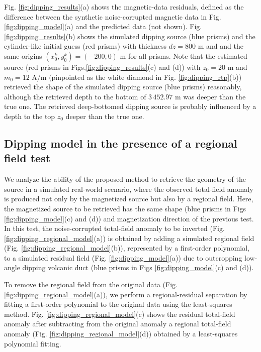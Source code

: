 Fig. \ref{fig:dipping_results}(a) shows the magnetic-data residuals, defined as the difference
between the synthetic noise-corrupted magnetic data in Fig. \ref{fig:dipping_model}(a) 
and the predicted data (not shown).
Fig. \ref{fig:dipping_results}(b) shows the simulated dipping source (blue prisms) and 
the cylinder-like initial guess (red prisms) with thickness $ dz = 800 $ m and 
and the same origins $(x^k_0, y^k_0) = (-200, 0) $ m for all prisms.
Note that the estimated source (red prisms in Figs.\ref{fig:dipping_results}(c) and (d))
with $z_0 = 20$ m and $m_0 = 12$ A/m 
(pinpointed as the white diamond in Fig. \ref{fig:dipping_rtp}(b))
retrieved the shape of the simulated dipping source (blue prisms) reasonably, although
the retrieved depth to the bottom of $ 3\,452.97 $ m was deeper than the true one.
The retrieved deep-bottomed dipping source is probably influenced by a depth to the top $ z_0 $ deeper than the true one.


\subsection{Dipping model in the presence of a regional field test}

We analyze the ability of the proposed method to retrieve the geometry of the source
in a simulated real-world scenario, where the observed total-field anomaly is produced not only by 
the magnetized source but also by a regional field. 
Here, the magnetized source to be retrieved has the same shape (blue prisms in Figs \ref{fig:dipping_model}(c) and (d)) and magnetization direction of the previous test. 
In this test, the noise-corrupted total-field anomaly to be inverted 
(Fig. \ref{fig:dipping_regional_model}(a)) is obtained by adding 
a simulated regional field (Fig. \ref{fig:dipping_regional_model}(b)), 
represented by a first-order polynomial, 
to a simulated residual field (Fig. \ref{fig:dipping_model}(a)) due to outcropping low-angle dipping volcanic duct (blue prisms in Figs \ref{fig:dipping_model}(c) and (d)). 

To remove the regional field from the original data (Fig. \ref{fig:dipping_regional_model}(a)),
we perform a regional-residual separation by fitting a first-order polynomial 
to the original data using the least-squares method.
Fig. \ref{fig:dipping_regional_model}(c) shows the residual total-field anomaly after subtracting from the original anomaly a regional total-field anomaly 
(Fig. \ref{fig:dipping_regional_model}(d)) obtained by a least-squares polynomial fitting. 

